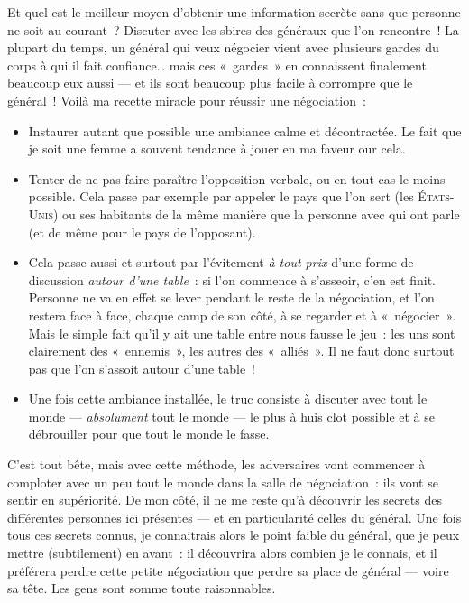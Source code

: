{	Et quel est le meilleur moyen d’obtenir une information secrète sans que personne ne soit au courant~?
	Discuter avec les sbires des généraux que l’on rencontre~!
	La plupart du temps, un général qui veux négocier vient avec plusieurs gardes du corps à qui il fait confiance… mais ces «~gardes~» en connaissent finalement beaucoup eux aussi — et ils sont beaucoup plus facile à corrompre que le général~!
	Voilà ma recette miracle pour réussir une négociation~:
	\begin{itemize}
		\item Instaurer autant que possible une ambiance calme et décontractée.  Le fait que je soit une femme a souvent tendance à jouer en ma faveur our cela.
		\item Tenter de ne pas faire paraître l’opposition verbale, ou en tout cas le moins possible.
			Cela passe par exemple par appeler le pays que l’on sert (les \textsc{États-Unis}) ou ses habitants de la même manière que la personne avec qui ont parle (et de même pour le pays de l’opposant).
		\item Cela passe aussi et surtout par l’évitement \emph{à tout prix} d’une forme de discussion \emph{autour d’une table}~:  si l’on commence à s’asseoir, c’en est finit.
			Personne ne va en effet se lever pendant le reste de la négociation, et l’on restera face à face, chaque camp de son côté, à se regarder et à «~négocier~».
			Mais le simple fait qu’il y ait une table entre nous fausse le jeu~:  les uns sont clairement des «~ennemis~», les autres des «~alliés~».
			Il ne faut donc surtout pas que l’on s’assoit autour d’une table~!
		\item Une fois cette ambiance installée, le truc consiste à discuter avec tout le monde — \emph{absolument} tout le monde — le plus à huis clot possible et à se débrouiller pour que tout le monde le fasse.
	\end{itemize}
	C’est tout bête, mais avec cette méthode, les adversaires vont commencer à comploter avec un peu tout le monde dans la salle de négociation~:  ils vont se sentir en supériorité.
	De mon côté, il ne me reste qu’à découvrir les secrets des différentes personnes ici présentes — et en particularité celles du général.
	Une fois tous ces secrets connus, je connaitrais alors le point faible du général, que je peux mettre (subtilement) en avant~:  il découvrira alors combien je le connais, et il préférera perdre cette petite négociation que perdre sa place de général — voire sa tête.
	Les gens sont somme toute raisonnables.

}
